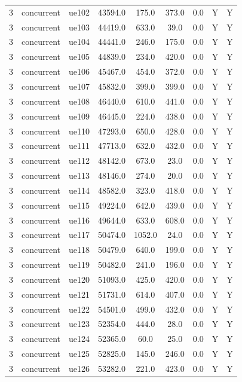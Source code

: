 \begin{table}[ht]
\begin{tabular}{|c|c|c|c|c|c|c|c|c|}
3 & concurrent & ue102 & 43594.0 & 175.0 & 373.0 & 0.0 & Y & Y \\
3 & concurrent & ue103 & 44419.0 & 633.0 & 39.0 & 0.0 & Y & Y \\
3 & concurrent & ue104 & 44441.0 & 246.0 & 175.0 & 0.0 & Y & Y \\
3 & concurrent & ue105 & 44839.0 & 234.0 & 420.0 & 0.0 & Y & Y \\
3 & concurrent & ue106 & 45467.0 & 454.0 & 372.0 & 0.0 & Y & Y \\
3 & concurrent & ue107 & 45832.0 & 399.0 & 399.0 & 0.0 & Y & Y \\
3 & concurrent & ue108 & 46440.0 & 610.0 & 441.0 & 0.0 & Y & Y \\
3 & concurrent & ue109 & 46445.0 & 224.0 & 438.0 & 0.0 & Y & Y \\
3 & concurrent & ue110 & 47293.0 & 650.0 & 428.0 & 0.0 & Y & Y \\
3 & concurrent & ue111 & 47713.0 & 632.0 & 432.0 & 0.0 & Y & Y \\
3 & concurrent & ue112 & 48142.0 & 673.0 & 23.0 & 0.0 & Y & Y \\
3 & concurrent & ue113 & 48146.0 & 274.0 & 20.0 & 0.0 & Y & Y \\
3 & concurrent & ue114 & 48582.0 & 323.0 & 418.0 & 0.0 & Y & Y \\
3 & concurrent & ue115 & 49224.0 & 642.0 & 439.0 & 0.0 & Y & Y \\
3 & concurrent & ue116 & 49644.0 & 633.0 & 608.0 & 0.0 & Y & Y \\
3 & concurrent & ue117 & 50474.0 & 1052.0 & 24.0 & 0.0 & Y & Y \\
3 & concurrent & ue118 & 50479.0 & 640.0 & 199.0 & 0.0 & Y & Y \\
3 & concurrent & ue119 & 50482.0 & 241.0 & 196.0 & 0.0 & Y & Y \\
3 & concurrent & ue120 & 51093.0 & 425.0 & 420.0 & 0.0 & Y & Y \\
3 & concurrent & ue121 & 51731.0 & 614.0 & 407.0 & 0.0 & Y & Y \\
3 & concurrent & ue122 & 54501.0 & 499.0 & 432.0 & 0.0 & Y & Y \\
3 & concurrent & ue123 & 52354.0 & 444.0 & 28.0 & 0.0 & Y & Y \\
3 & concurrent & ue124 & 52365.0 & 60.0 & 25.0 & 0.0 & Y & Y \\
3 & concurrent & ue125 & 52825.0 & 145.0 & 246.0 & 0.0 & Y & Y \\
3 & concurrent & ue126 & 53282.0 & 221.0 & 423.0 & 0.0 & Y & Y \\

\end{tabular}
\end{table}
